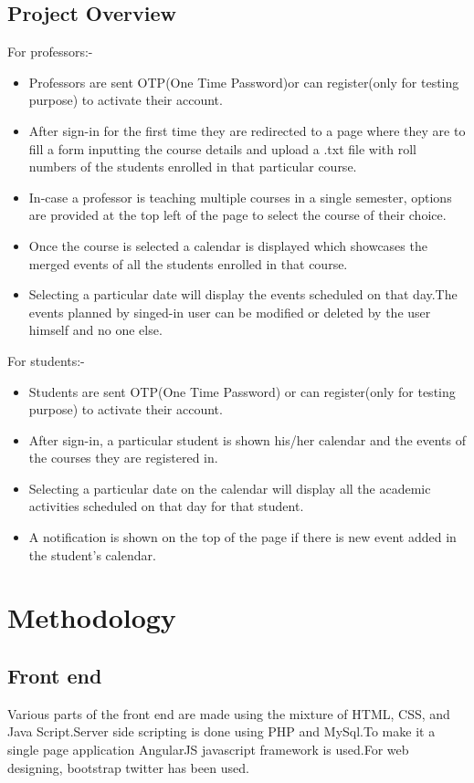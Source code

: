 \documentclass[a4paper, 12pt]{article}
\begin{document}
\subsection{Project Overview}
For professors:-
\begin{itemize}
  \item Professors are sent OTP(One Time Password)or can register(only for testing purpose) to activate their account.
  \item After sign-in for the first time they are redirected to a page where they are to fill a form inputting the course details and upload a .txt file with roll numbers of the students enrolled in that particular course.
  \item In-case a professor is teaching multiple courses in a single semester, options are provided at the top left of the page to select the course of their choice.
  \item Once the course is selected a calendar is displayed which showcases the merged events of all the students enrolled in that course.
  \item Selecting a particular date will display the events scheduled on that day.The events planned by singed-in user can be modified or deleted by the user himself and no one else.
\end{itemize}
For students:-
\begin{itemize}
  \item Students are sent OTP(One Time Password) or can register(only for testing purpose) to activate their account.
  \item After sign-in, a particular student is shown his/her calendar and the events of the courses they are registered in.
  \item Selecting a particular date on the calendar will display all the academic activities scheduled on that day for that student.
  \item A notification is shown on the top of the page if there is new event added in the student's calendar.
\end{itemize}

\section{Methodology}
\subsection{Front end}
Various parts of the front end are made using the mixture of HTML, CSS, and Java Script.Server side scripting is done using PHP and MySql.To make it a single page application AngularJS javascript framework is used.For web designing, bootstrap twitter has been used.
\end{document}
